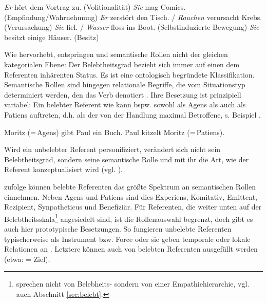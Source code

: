 \begin{exe}
\ex \label{ex:proto-agens}
	\begin{xlist}
        \ex  \textit{Er} hört dem Vortrag zu. (Volitionalität)
        \ex  \textit{Sie} mag Comics. (Empfindung/Wahrnehmung)
        \ex \textit{Er} zerstört den Tisch. / \textit{Rauchen} verursacht Krebs. (Verursachung)
        \ex  \textit{Sie} fiel. / \textit{Wasser} floss ins Boot. (Selbstinduzierte Bewegung)
        \ex  \textit{Sie} besitzt einige Häuser. (Besitz)
	\end{xlist}
\end{exe}

Wie \textcite[][151--152]{Yamamoto1999} hervorhebt, entspringen  und semantische Rollen  nicht der gleichen kategorialen Ebene: Der Belebtheitsgrad   bezieht sich immer auf einen dem Referenten inhärenten Status. Es ist eine ontologisch begründete Klassifikation. Semantische Rollen  sind hingegen relationale Begriffe, die vom Situationstyp determiniert werden, den das Verb denotiert \parencite[13]{Lehmann2004a}. Ihre Besetzung ist prinzipiell variabel: Ein belebter  Referent wie  kann bspw. sowohl als Agens  als auch als Patiens auftreten, d.h. als der von der Handlung maximal Betroffene, s. Beispiel . 
 
\begin{exe}
	\ex \label{ex:rollen}
	\begin{xlist}
	 	\ex Moritz (=\,Agens) gibt Paul ein Buch.
		\ex Paul kitzelt Moritz (=\,Patiens).
 
	\end{xlist}
\end{exe}
\noindent
 
Wird ein unbelebter  Referent personifiziert, verändert sich nicht sein  Belebtheitsgrad, sondern seine semantische Rolle  und mit ihr die Art, wie  der Referent konzeptualisiert wird (vgl. ). 

\textcite[12]{Lehmann2004a} zufolge können belebte  Referenten das größte Spektrum an semantischen Rollen  einnehmen. Neben Agens  und Patiens sind dies Experiens, Komitativ, Emittent, Rezipient, Synpatheticus und Benefiziär.  Für Referenten, die weiter unten auf der Belebtheitsskala\footnote{\textcite{Lehmann2004a} sprechen nicht von Belebheits- sondern  von einer 
Empathiehierarchie, vgl. auch Abschnitt \ref{sec:belebt}.} angesiedelt sind, ist die Rollenauswahl  begrenzt, doch gibt es auch hier prototypische Besetzungen. So fungieren unbelebte  Referenten typischerweise als Instrument bzw. Force oder sie geben temporale oder lokale Relationen an \parencite[76]{Primus2012}. Letztere können auch von belebten  Referenten ausgefüllt werden (etwa:  = Ziel). 

